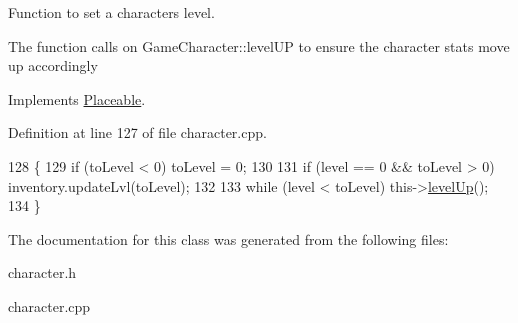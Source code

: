 Function to set a characters level. 

The function calls on Game\+Character\+::level\+UP to ensure the character stats move up accordingly 

Implements \hyperlink{class_placeable}{Placeable}.



Definition at line 127 of file character.\+cpp.


\begin{DoxyCode}
128 \{
129     \textcolor{keywordflow}{if} (toLevel < 0) toLevel = 0;
130 
131     \textcolor{keywordflow}{if} (level == 0 && toLevel > 0) inventory.updateLvl(toLevel);
132     
133     \textcolor{keywordflow}{while} (level < toLevel) this->\hyperlink{class_game_character_a367a537148a995677d9649b975cb326b}{levelUp}();
134 \}
\end{DoxyCode}


The documentation for this class was generated from the following files\+:\begin{DoxyCompactItemize}
\item 
character.\+h\item 
character.\+cpp\end{DoxyCompactItemize}
